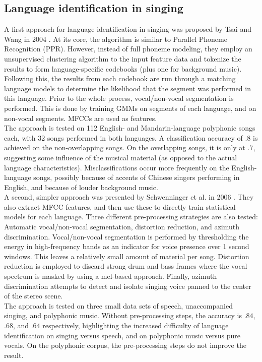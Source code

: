 \subsection{Language identification in singing}
A first approach for language identification in singing was proposed by Tsai and Wang in 2004 \cite{tsai_wang}. At its core, the algorithm is similar to Parallel Phoneme Recognition (PPR). However, instead of full phoneme modeling, they employ an unsupervised clustering algorithm to the input feature data and tokenize the results to form language-specific codebooks (plus one for background music). Following this, the results from each codebook are run through a matching language models to determine the likelihood that the segment was performed in this language. Prior to the whole process, vocal/non-vocal segmentation is performed. This is done by training GMMs on segments of each language, and on non-vocal segments. MFCCs are used as features.\\
The approach is tested on 112 English- and Mandarin-language polyphonic songs each, with 32 songs performed in both languages. A classification accuracy of $.8$ is achieved on the non-overlapping songs. On the overlapping songs, it is only at $.7$, suggesting some influence of the musical material (as opposed to the actual language characteristics). Misclassifications occur more frequently on the English-language songs, possibly because of accents of Chinese singers performing in English, and because of louder background music.\\
\medskip
A second, simpler approach was presented by Schwenninger et al. in 2006 \cite{schwenninger}. They also extract MFCC features, and then use these to directly train statistical models for each language. Three different pre-processing strategies are also tested: Automatic vocal/non-vocal segmentation, distortion reduction, and azimuth discrimination. Vocal/non-vocal segmentation is performed by thresholding the energy in high-frequency bands as an indicator for voice presence over 1 second windows. This leaves a relatively small amount of material per song. Distortion reduction is employed to discard strong drum and bass frames where the vocal spectrum is masked by using a mel-based approach. Finally, azimuth discrimination attempts to detect and isolate singing voice panned to the center of the stereo scene.\\
The approach is tested on three small data sets of speech, unaccompanied singing, and polyphonic music. Without pre-processing steps, the accuracy is $.84$, $.68$, and $.64$ respectively, highlighting the increased difficulty of language identification on singing versus speech, and on polyphonic music versus pure vocals. On the polyphonic corpus, the pre-processing steps do not improve the result.\\
